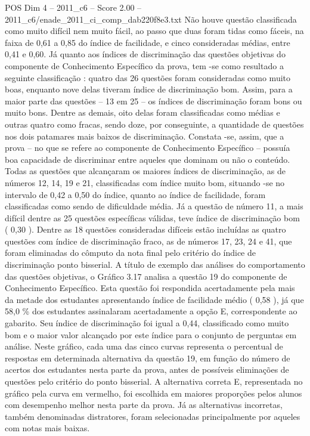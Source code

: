 \begin{textsample}{POS Dim 4 – 2011\_c6 – Score 2.00 – 2011\_c6/enade\_2011\_ci\_comp\_dab220f8e3.txt}
Não houve questão classificada como muito difícil nem muito fácil, ao passo que duas foram tidas como fáceis, na faixa de 0,61 a 0,85 do índice de facilidade, e cinco consideradas médias, entre 0,41 e 0,60.
Já quanto aos índices de discriminação das questões objetivas do componente de Conhecimento Específico da prova, tem -se como resultado a seguinte classificação : quatro das 26 questões foram consideradas como muito boas, enquanto nove delas tiveram índice de discriminação bom.
Assim, para a maior parte das questões – 13 em 25 – os índices de discriminação foram bons ou muito bons.
Dentre as demais, oito delas foram classificadas como médias e outras quatro como fracas, sendo doze, por conseguinte, a quantidade de questões nos dois patamares mais baixos de discriminação.
Constata -se, assim, que a prova – no que se refere ao componente de Conhecimento Específico – possuía boa capacidade de discriminar entre aqueles que dominam ou não o conteúdo.
Todas as questões que alcançaram os maiores índices de discriminação, as de números 12, 14, 19 e 21, classificadas com índice muito bom, situando -se no intervalo de 0,42 a 0,50 do índice, quanto ao índice de facilidade, foram classificadas como sendo de dificuldade média.
Já a questão de número 11, a mais difícil dentre as 25 questões específicas válidas, teve índice de discriminação bom ( 0,30 ).
Dentre as 18 questões consideradas difíceis estão incluídas as quatro questões com índice de discriminação fraco, as de números 17, 23, 24 e 41, que foram eliminadas do cômputo da nota final pelo critério do índice de discriminação ponto bisserial.
A título de exemplo das análises do comportamento das questões objetivas, o Gráfico 3.17 analisa a questão 19 do componente de Conhecimento Específico.
Esta questão foi respondida acertadamente pela mais da metade dos estudantes apresentando índice de facilidade médio ( 0,58 ), já que 58,0 \% dos estudantes assinalaram acertadamente a opção E, correspondente ao gabarito.
Seu índice de discriminação foi igual a 0,44, classificado como muito bom e o maior valor alcançado por este índice para o conjunto de perguntas em análise.
Neste gráfico, cada uma das cinco curvas representa o percentual de respostas em determinada alternativa da questão 19, em função do número de acertos dos estudantes nesta parte da prova, antes de possíveis eliminações de questões pelo critério do ponto bisserial.
A alternativa correta E, representada no gráfico pela curva em vermelho, foi escolhida em maiores proporções pelos alunos com desempenho melhor nesta parte da prova.
Já as alternativas incorretas, também denominadas distratores, foram selecionadas principalmente por aqueles com notas mais baixas.

\end{textsample}
